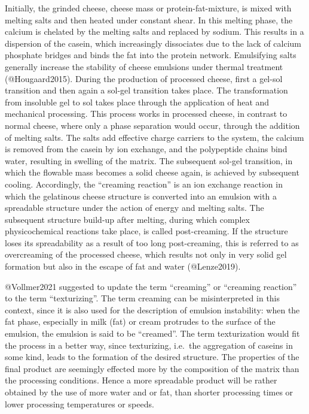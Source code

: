 \documentclass[
]{article}
\begin{document}
Initially, the grinded cheese, cheese mass or protein-fat-mixture, is
mixed with melting salts and then heated under constant shear. In this
melting phase, the calcium is chelated by the melting salts and replaced
by sodium. This results in a dispersion of the casein, which
increasingly dissociates due to the lack of calcium phosphate bridges
and binds the fat into the protein network. Emulsifying salts generally
increase the stability of cheese emulsions under thermal treatment
(@Hougaard2015). During the production of processed cheese, first a
gel-sol transition and then again a sol-gel transition takes place. The
transformation from insoluble gel to sol takes place through the
application of heat and mechanical processing. This process works in
processed cheese, in contrast to normal cheese, where only a phase
separation would occur, through the addition of melting salts. The salts
add effective charge carriers to the system, the calcium is removed from
the casein by ion exchange, and the polypeptide chains bind water,
resulting in swelling of the matrix. The subsequent sol-gel transition,
in which the flowable mass becomes a solid cheese again, is achieved by
subsequent cooling. Accordingly, the ``creaming reaction'' is an ion
exchange reaction in which the gelatinous cheese structure is converted
into an emulsion with a spreadable structure under the action of energy
and melting salts. The subsequent structure build-up after melting,
during which complex physicochemical reactions take place, is called
post-creaming. If the structure loses its spreadability as a result of
too long post-creaming, this is referred to as overcreaming of the
processed cheese, which results not only in very solid gel formation but
also in the escape of fat and water (@Lenze2019).

@Vollmer2021 suggested to update the term ``creaming'' or ``creaming
reaction'' to the term ``texturizing''. The term creaming can be
misinterpreted in this context, since it is also used for the
description of emulsion instability: when the fat phase, especially in
milk (fat) or cream protrudes to the surface of the emulsion, the
emulsion is said to be ``creamed''. The term texturization would fit the
process in a better way, since texturizing, i.e.~the aggregation of
caseins in some kind, leads to the formation of the desired structure.
The properties of the final product are seemingly effected more by the
composition of the matrix than the processing conditions. Hence a more
spreadable product will be rather obtained by the use of more water and
or fat, than shorter processing times or lower processing temperatures
or speeds.
\end{document}
